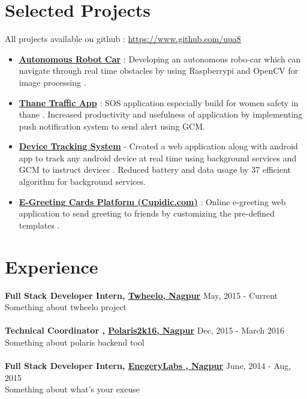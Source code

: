 \documentclass[margin, centered]{res}
\begin{document}
\begin{resume}

\section{Selected Projects}
All projects available on github : \url{https://www.github.com/upa8}
\begin{itemize}[leftmargin=*]
\item \textbf{\href{https://github.com/upa8/Autonomous-Robot-Car}{Autonomous Robot Car}} : Developing an autonomous robo-car which can navigate through real time obstacles by using Raspberrypi and OpenCV for image processing .
 \item \textbf{\href{https://github.com/upa8/Thane-Traffic-App}{Thane Traffic App}} : SOS application especially build for women safety in thane . Increased productivity 
and usefulness of application by implementing push notification system to send alert using GCM.
 \item \textbf{\href{https://github.com/upa8/Device-Tracking-System}{Device Tracking System}} - Created a web application along with android app to track any android device at real 
time  using background services and GCM to instruct devices . Reduced battery and data usage by 37%
efficient algorithm for background services. 
 \item \textbf{\href{http://cupidic.com/}{E-Greeting Cards Platform (Cupidic.com)}} : 
 Online e-greeting web application to send greeting to friends by customizing the pre-defined 
templates . 
  
\end{itemize}
 
\section{Experience}
\textbf{Full Stack Developer Intern, \href{http://www.twheelo.com}{Twheelo, Nagpur}} \hfill May, 2015 - Current\\
Something about twheelo project\\
\\
\textbf{Technical Coordinator , \href{http://www.polaris2k16.in/}{Polaris2k16, Nagpur}} \hfill Dec, 2015 - March 2016 \\
Something about polaris backend tool\\
\\
\textbf{Full Stack Developer Intern, \href{http://www.energylabs.in/}{EnegeryLabs , Nagpur}}
 \hfill June, 2014 - Aug, 2015 \\ 
Something about what's your excuse
\\


\end{resume}
\end{document}
